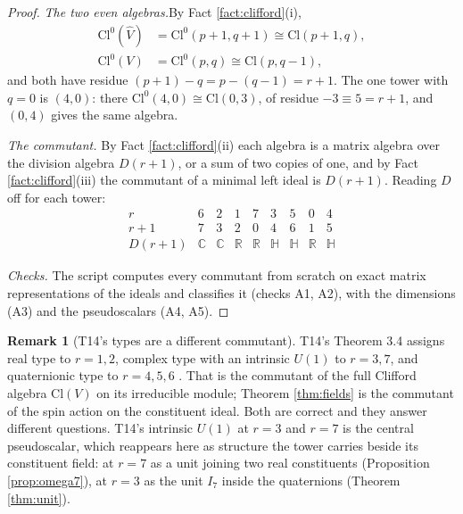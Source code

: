 \documentclass[11pt]{article}
\theoremstyle{definition}
\newtheorem{remark}[theorem]{Remark}
\newcommand{\Cl}{\mathrm{Cl}}
\newcommand{\R}{\mathbb{R}}
\newcommand{\C}{\mathbb{C}}
\newcommand{\HH}{\mathbb{H}}
\newcommand{\hatV}{\widehat{V}}
\newcommand{\pstep}[1]{\par\smallskip\noindent\textit{#1.}\enspace}
\begin{document}
\begin{proof}
\textit{The two even algebras.}\enspace By Fact \ref{fact:clifford}(i),
\begin{align*}
\Cl^{0}(\hatV) &= \Cl^{0}(p+1, q+1) \cong \Cl(p+1, q), \\
\Cl^{0}(V) &= \Cl^{0}(p, q) \cong \Cl(p, q-1),
\end{align*}
and both have residue $(p+1) - q = p - (q-1) = r + 1$. The one tower with $q = 0$ is $(4,0)$: there $\Cl^{0}(4,0) \cong \Cl(0,3)$, of residue $-3 \equiv 5 = r + 1$, and $(0,4)$ gives the same algebra.

\pstep{The commutant} By Fact \ref{fact:clifford}(ii) each algebra is a matrix algebra over the division algebra $D(r+1)$, or a sum of two copies of one, and by Fact \ref{fact:clifford}(iii) the commutant of a minimal left ideal is $D(r+1)$. Reading $D$ off for each tower:
\[
\begin{array}{c|cccccccc}
r & 6 & 2 & 1 & 7 & 3 & 5 & 0 & 4 \\
r + 1 & 7 & 3 & 2 & 0 & 4 & 6 & 1 & 5 \\ \hline
D(r+1) & \C & \C & \R & \R & \HH & \HH & \R & \HH
\end{array}
\]

\pstep{Checks} The script computes every commutant from scratch on exact matrix representations of the ideals and classifies it (checks A1, A2), with the dimensions (A3) and the pseudoscalars (A4, A5).
\end{proof}

\begin{remark}[T14's types are a different commutant]\label{rem:T14types}
T14's Theorem 3.4 assigns real type to $r = 1, 2$, complex type with an intrinsic $U(1)$ to $r = 3, 7$, and quaternionic type to $r = 4, 5, 6$ \cite[Thm.~3.4]{ButlerT14}. That is the commutant of the full Clifford algebra $\Cl(V)$ on its irreducible module; Theorem \ref{thm:fields} is the commutant of the spin action on the constituent ideal. Both are correct and they answer different questions. T14's intrinsic $U(1)$ at $r = 3$ and $r = 7$ is the central pseudoscalar, which reappears here as structure the tower carries beside its constituent field: at $r = 7$ as a unit joining two real constituents (Proposition \ref{prop:omega7}), at $r = 3$ as the unit $I_{7}$ inside the quaternions (Theorem \ref{thm:unit}).
\end{remark}
\end{document}

